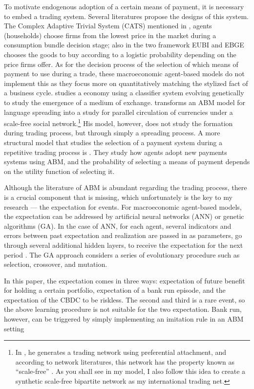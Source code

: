 To motivate endogenous adoption of a certain means of payment, it is necessary
to embed a trading system. Several literatures propose the designs of this
system. The Complex Adaptive Trivial System (CATS) mentioned in
\citet*{HandbookABM}, agents (households) choose firms from the lowest price in
the market during a consumption bundle decision stage; also in
\citet*{HandbookABM} the two framework EUBI and EBGE chooses the goods to buy
according to a logistic probability depending on the price firms offer. As for
the decision process of the selection of which means of payment to use during a
trade, these macroeconomic agent-based models do not implement this as they
focus more on quantitatively matching the stylized fact of a business cycle.
\citet*{Sargent90-MoneyAI} studies a \citet*{KW98} economy using a classifier
system evolving genetically to study the emergence of a medium of exchange.
\citet*{Manolis21} transforms an ABM model for language spreading into a study
for parallel circulation of currencies under a scale-free social
network.\footnote{In \citet*{Manolis21}, he generates a trading network using
preferential attachment, and according to network literatures, this network has
the property known as ``scale-free'' \citep*{Price1976}. As you shall see in my
model, I also follow this idea to create a synthetic scale-free bipartite
network as my international trading net.}
His model, however, does not study the formation during trading process, but through
simply a spreading process.
A more structural model that studies the selection of a payment system during a
repetitive trading process is \citet*{Trade_ABM_MOP2006}. They study how agents
adopt new payments systems using ABM, and the probability of selecting a
means of payment depends on the utility function of selecting it.

Although the literature of ABM is abundant regarding the trading process, there
is a crucial component that is missing, which unfortunately is the key to my
research --- the expectation for events. For macroeconomic agent-based models,
the expectation can be addressed by artificial neural networks (ANN) or genetic
algorithms (GA).  In the case of ANN, for each agent, several indicators and
errors between past expectation and realization are passed in as parameters, go
through several additional hidden layers, to receive the expectation for the
next period \citep*[see][]{Salle15-ABM_EXP}.  The GA approach considers a series of evolutionary
procedure such as selection, crossover, and mutation\citep*[see][]{Arifovic18-GA_EXP}.

In this paper, the expectation comes in three ways: expectation of future benefit
for holding a certain portfolio, expectation of a bank run episode, and the
expectation of the CBDC to be riskless. The second and third is a rare event, so
the above learning procedure is not suitable for the two expectation.
Bank run, however, can be triggered by simply implementing an imitation rule in
an ABM setting~\citep*{Santos2021}
